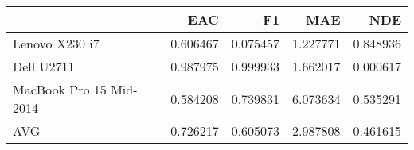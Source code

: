 \begin{tabular}{lrrrr}
\toprule
{} &       EAC &        F1 &       MAE &       NDE \\
\midrule
Lenovo X230 i7          &  0.606467 &  0.075457 &  1.227771 &  0.848936 \\
Dell U2711              &  0.987975 &  0.999933 &  1.662017 &  0.000617 \\
MacBook Pro 15 Mid-2014 &  0.584208 &  0.739831 &  6.073634 &  0.535291 \\
AVG                     &  0.726217 &  0.605073 &  2.987808 &  0.461615 \\
\bottomrule
\end{tabular}
